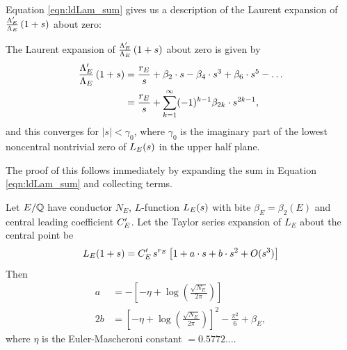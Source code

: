 Equation \ref{eqn:ldLam_sum} gives us a description of the Laurent expansion of $\frac{\Lambda_E^{\prime}}{\Lambda_E}\left(1+s\right)$ about zero:
\begin{proposition}[GRH]\label{prop:ldLam_series_at_zero}
The Laurent expansion of $\frac{\Lambda_E^{\prime}}{\Lambda_E}\left(1+s\right)$ about zero is given by
\begin{align}
\frac{\Lambda_E^{\prime}}{\Lambda_E}\left(1+s\right) &= \frac{r_E}{s} + \beta_2\cdot s - \beta_4\cdot s^3 + \beta_6\cdot  s^5 - \ldots \\
& = \frac{r_E}{s} + \sum_{k=1}^{\infty} (-1)^{k-1}\beta_{2k}\cdot s^{2k-1},
\end{align}
and this converges for $|s|<\gamma_0$, where $\gamma_0$ is the imaginary part of the lowest noncentral nontrivial zero of $L_E(s)$ in the upper half plane.
\end{proposition}
The proof of this follows immediately by expanding the sum in Equation \ref{eqn:ldLam_sum} and collecting terms. \\

\begin{corollary}[GRH]\label{cor:ldLe_expansion}
Let $E/\mathbb{Q}$ have conductor $N_E$, $L$-function $L_E(s)$ with bite $\beta_E = \beta_2(E)$ and central leading coefficient $C_E^{\prime}$. Let the Taylor series expansion of $L_E$ about the central point be
\begin{equation}
L_E(1+s) = C_E^{\prime} \, s^{r_E}\left[1 + a\cdot s + b\cdot s^2 + O(s^3)\right]
\end{equation}
Then 
\begin{align}
a &= -\left[-\eta + \log\left(\frac{\sqrt{N_E}}{2\pi}\right)\right] \\
2b &= \left[-\eta + \log\left(\frac{\sqrt{N_E}}{2\pi}\right)\right]^2 - \frac{\pi^2}{6} + \beta_E,
\end{align}
where $\eta$ is the Euler-Mascheroni constant $= 0.5772\ldots$.
\end{corollary}

